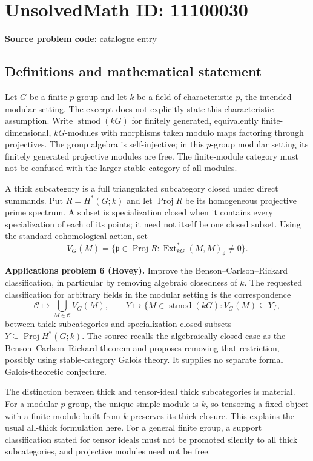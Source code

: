 \documentclass[11pt]{article}
\begin{document}
\section*{UnsolvedMath ID: 11100030}
\textbf{Source problem code:} catalogue entry
\subsection{Definitions and mathematical statement}
Let $G$ be a finite $p$-group and let $k$ be a field of characteristic $p$, the intended modular setting. The excerpt does not explicitly state this characteristic assumption. Write $\operatorname{stmod}(kG)$ for finitely generated, equivalently finite-dimensional, $kG$-modules with morphisms taken modulo maps factoring through projectives. The group algebra is self-injective; in this $p$-group modular setting its finitely generated projective modules are free. The finite-module category must not be confused with the larger stable category of all modules.

A thick subcategory is a full triangulated subcategory closed under direct summands. Put $R=H^*(G;k)$ and let $\operatorname{Proj}R$ be its homogeneous projective prime spectrum. A subset is specialization closed when it contains every specialization of each of its points; it need not itself be one closed subset. Using the standard cohomological action, set
\[
 V_G(M)=\{\mathfrak p\in\operatorname{Proj}R:
 \operatorname{Ext}_{kG}^*(M,M)_{\mathfrak p}\ne0\}.
\]

\textbf{Applications problem 6 (Hovey).} Improve the Benson--Carlson--Rickard classification, in particular by removing algebraic closedness of $k$. The requested classification for arbitrary fields in the modular setting is the correspondence
\[
 \mathcal C\longmapsto\bigcup_{M\in\mathcal C}V_G(M),\qquad
 Y\longmapsto\{M\in\operatorname{stmod}(kG):V_G(M)\subseteq Y\},
\]
between thick subcategories and specialization-closed subsets $Y\subseteq\operatorname{Proj}H^*(G;k)$. The source recalls the algebraically closed case as the Benson--Carlson--Rickard theorem and proposes removing that restriction, possibly using stable-category Galois theory. It supplies no separate formal Galois-theoretic conjecture.

The distinction between thick and tensor-ideal thick subcategories is material. For a modular $p$-group, the unique simple module is $k$, so tensoring a fixed object with a finite module built from $k$ preserves its thick closure. This explains the usual all-thick formulation here. For a general finite group, a support classification stated for tensor ideals must not be promoted silently to all thick subcategories, and projective modules need not be free.
\end{document}
